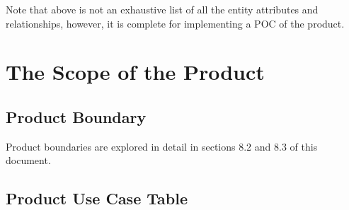 \documentclass[12pt]{article}
\begin{document}
Note that above is not an exhaustive list of all the entity attributes and relationships, however, it is complete for implementing a POC of the product.
\newpage

\section{The Scope of the Product}
\subsection{Product Boundary}

Product boundaries are explored in detail in sections 8.2 and 8.3 of this document.

\subsection{Product Use Case Table}
\end{document}
